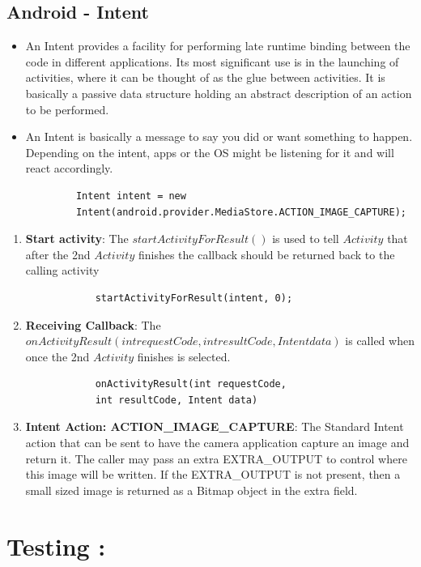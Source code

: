 \documentclass{article}
\begin{document}
\subsection{Android - Intent}
	\begin{itemize}
		\item An Intent provides a facility for performing late runtime binding between the code in different applications. Its most significant use is in the launching of activities, where it can be thought of as the glue between activities. It is basically a passive data structure holding an abstract description of an action to be performed.
        \item An Intent is basically a message to say you did or want something to happen. Depending on the intent, apps or the OS might be listening for it and will react accordingly.
	\end{itemize}
    \begin{lstlisting}
     		Intent intent = new
            Intent(android.provider.MediaStore.ACTION_IMAGE_CAPTURE);
    \end{lstlisting}
    \begin{enumerate}
    	\item \textbf{Start activity}:
	    The $startActivityForResult()$ is used to tell $Activity$ that after the 2nd $Activity$ finishes the callback should be returned back to the calling activity
     	\begin{lstlisting}
     		startActivityForResult(intent, 0);
     	\end{lstlisting}
     \item \textbf{Receiving Callback}:
     The $onActivityResult(int requestCode, int resultCode, Intent data)$ is called when once the 2nd $Activity$ finishes is selected.
     	\begin{lstlisting}
     		onActivityResult(int requestCode, 
            int resultCode, Intent data)
     	\end{lstlisting}
     \item \textbf{Intent Action: ACTION\_IMAGE\_CAPTURE}:
     The Standard Intent action that can be sent to have the camera application capture an image and return it. The caller may pass an extra EXTRA\_OUTPUT to control where this image will be written. If the EXTRA\_OUTPUT is not present, then a small sized image is returned as a Bitmap object in the extra field.
	\end{enumerate}


\section{Testing :}
\end{document}
